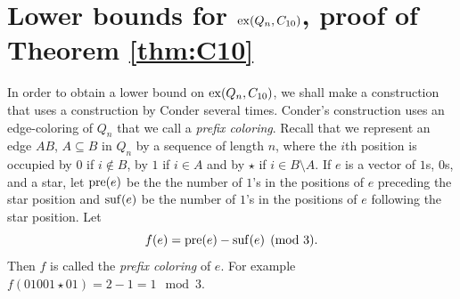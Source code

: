 \documentclass[11pt, a4paper]{article}
\newcommand{\ex}{{\rm  ex}}
\newcommand{\pre}{{\rm pre}}
\newcommand{\suf}{{\rm suf}}
\begin{document}

\section{Lower bounds for $\ex(Q_n, C_{10})$, proof of Theorem \ref{thm:C10}}\label{sec:C10}

In order to obtain a lower bound on  $\ex(Q_n, C_{10})$, we shall make a construction that uses a construction by Conder   \cite{conder} several times.   Conder's construction uses an edge-coloring of $Q_n$ that we call a {\it prefix coloring}. 
Recall that we represent an edge $AB$, $A\subseteq B$ in $Q_n$ by a sequence of length $n$, 
where the $i$th position is occupied by $0$ if $i\notin B$,  by $1$ if $i\in A$ and by $\star$ if $i\in B\setminus A$. 
If $e$ is a  vector of $1$s, $0$s, and a star,  let  $\pre(e)$ be the the number of $1$'s in the positions of $e$ preceding the star position and  $\suf(e)$ be  the number of $1$'s in the positions of $e$ following the star position. 
Let $$f(e)= \pre(e)-\suf(e) \pmod 3.$$  Then $f$ is called the {\it prefix coloring} of $e$.  For example $f(01001\star 01) = 2 - 1 =1 \mod 3 $. 
\end{document}
